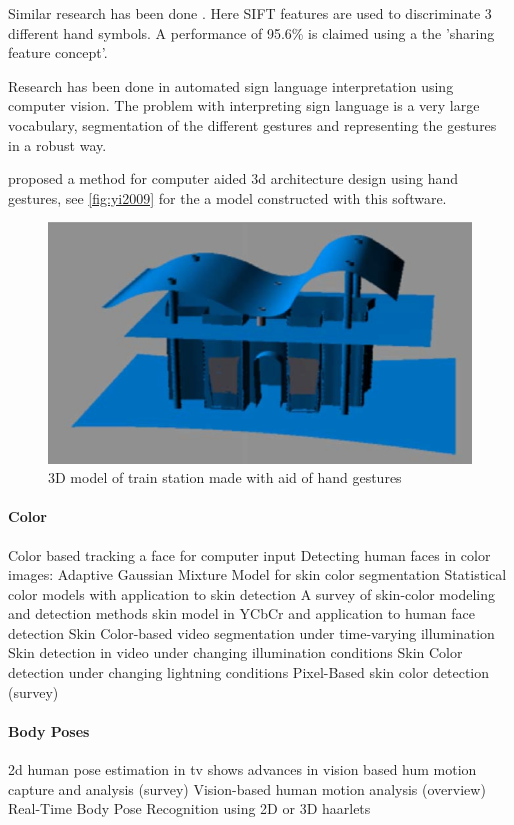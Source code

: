 Similar research has been done \cite{Wang2007}. Here SIFT features are used to discriminate 3 different hand symbols. A performance of 95.6\% is claimed using a the 'sharing feature concept'.


Research has been done in automated sign language interpretation using computer vision\cite{Buehler2009}\cite{RichardBowden2004}. The problem with interpreting sign language is a very large vocabulary, segmentation of the different gestures and representing the gestures in a robust way.

\cite{Yi2009} proposed a method for computer aided 3d architecture design using hand gestures, see \autoref{fig:yi2009} for the a model constructed with this software.

\begin{figure}[htbp]
	\center{}
	\includegraphics[width=0.3\linewidth]{figures/yi2009.png}
	\caption{3D model of train station made with aid of hand gestures}
	\label{fig:yi2009}
\end{figure}





\paragraph{Color}
Color based tracking a face for computer input \cite{Bradski1998}
Detecting human faces in color images: \cite{Cai1999}
Adaptive Gaussian Mixture Model for skin color segmentation \cite{Hassanpour2008}
Statistical color models with application to skin detection \cite{Jones1999}
A survey of skin-color modeling and detection methods \cite{Kakumanu2007}
skin model in YCbCr and application to human face detection \cite{Phung2002}
Skin Color-based video segmentation under time-varying illumination \cite{Sigal2004}
Skin detection in video under changing illumination conditions \cite{Soriano2000}
Skin Color detection under changing lightning conditions \cite{Stoerring1999}
Pixel-Based skin color detection (survey) \cite{vsa03survey}

\paragraph{Body Poses}
2d human pose estimation in tv shows \cite{ferrari2008}
advances in vision based hum motion capture and analysis (survey) \cite{Moeslund2006}
Vision-based human motion analysis (overview) \cite{Poppe2007}
Real-Time Body Pose Recognition using 2D or 3D haarlets \cite{VandenBergh2009}

